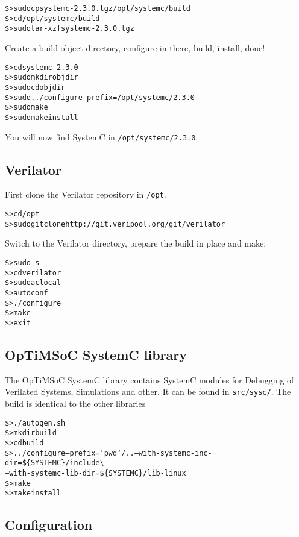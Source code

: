 \begin{alltt}
\$> sudo cp systemc-2.3.0.tgz /opt/systemc/build
\$> cd /opt/systemc/build
\$> sudo tar -xzf systemc-2.3.0.tgz
\end{alltt}

Create a build object directory, configure in there, build, install,
done!

\begin{alltt}
\$> cd systemc-2.3.0
\$> sudo mkdir objdir
\$> sudo cd objdir
\$> sudo ../configure --prefix=/opt/systemc/2.3.0
\$> sudo make
\$> sudo make install
\end{alltt}

You will now find SystemC in \verb|/opt/systemc/2.3.0|.

\subsection{Verilator}

First clone the Verilator repository in \verb|/opt|.

\begin{alltt}
\$> cd /opt
\$> sudo git clone http://git.veripool.org/git/verilator
\end{alltt}

Switch to the Verilator directory, prepare the build in place and make:

\begin{alltt}
\$> sudo -s
\$> cd verilator
\$> sudo aclocal
\$> autoconf
\$> ./configure
\$> make
\$> exit
\end{alltt}

\subsection{OpTiMSoC SystemC library}

The OpTiMSoC SystemC library contains SystemC modules for Debugging of
Verilated Systems, Simulations and other. It can be found in
\verb|src/sysc/|. The build is identical to the other libraries

\begin{alltt}
\$> ./autogen.sh
\$> mkdir build
\$> cd build
\$> ../configure --prefix=`pwd`/.. --with-systemc-inc-dir=\$\{SYSTEMC\}/include \textbackslash
      --with-systemc-lib-dir=\$\{SYSTEMC\}/lib-linux
\$> make
\$> make install
\end{alltt}

\subsection{Configuration}

